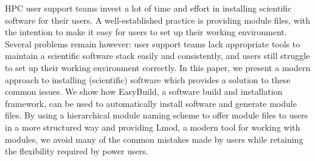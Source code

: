HPC user support teams invest a lot of time and effort in installing scientific
software for their users. A well-established practice is providing module files,
with the intention to make it easy for users to set up their working environment.
Several problems remain however: user support teams lack appropriate tools to
maintain a scientific software stack easily and consistently, and users still
struggle to set up their working environment correctly.
In this paper, we present a modern approach to installing (scientific) software which
provides a solution to these common issues. We show how EasyBuild, a software
build and installation framework, can be used to automatically install software
and generate module files.  By using a hierarchical module naming
scheme to offer module files to users in a more structured way and providing Lmod,
a modern tool for working with modules, we avoid many of the common mistakes made
by users while retaining the flexibility required by power users. 
